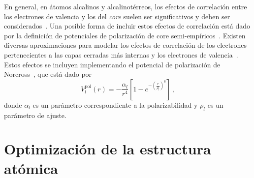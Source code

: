 En general, en átomos alcalinos y alcalinotérreos, los efectos de 
correlación entre los electrones de valencia y los del \textit{core} 
suelen ser significativos y deben ser considerados~\cite{Bartschat:04,
Muller:83}. Una posible forma de incluir estos efectos de correlación 
está dado por la definición de potenciales de polarización de core 
semi-empíricos~\cite{Loughlin:88}. Existen diversas aproximaciones para 
modelar los efectos de correlación de los electrones pertenecientes a 
las capas cerradas más internas y los electrones de 
valencia~\cite{Seaton:72,Loughlin:73,Migdalek:78}. Estos efectos se 
incluyen implementando el potencial de polarización de 
Norcross~\cite{Norcross:76}, que está dado por
\begin{equation}
 V_l^{\textrm{pol}}(r) = -\frac{\alpha_l}{r^4}\left[1-
e^{-\left(\tfrac{r}{\rho_l}\right)^6}\right]\,,
\label{eq:Norcross-pot}
\end{equation}
donde $\alpha_l$ es un parámetro correspondiente a la polarizabilidad y 
$\rho_l$ es un parámetro de ajuste.

\section{Optimización de la estructura atómica}
\label{sec:optproblems}

